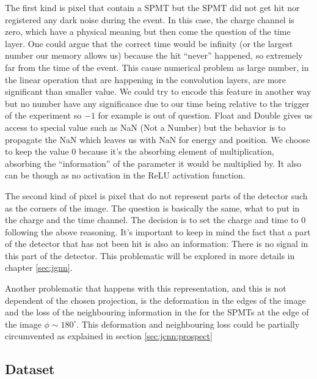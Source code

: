 \documentclass[../main.tex]{subfiles}
\begin{document}
The first kind is pixel that contain a SPMT but the SPMT did not get hit nor registered any dark noise during the event. In this case, the charge channel is zero, which have a physical meaning but then come the question of the time layer. One could argue that the correct time would be infinity (or the largest number our memory allows us) because the hit ``never'' happened, so extremely far from the time of the event. This cause numerical problem as large number, in the linear operation that are happening in the convolution layers, are more significant than smaller value. We could try to encode this feature in another way but no number have any significance due to our time being relative to the trigger of the experiment so $-1$ for example is out of question. Float and Double gives us access to special value such as NaN (Not a Number) \cite{noauthor_ieee_2019} but the behavior is to propagate the NaN which leaves us with NaN for energy and position. We choose to keep the value 0 because it's the absorbing element of multiplication, absorbing the ``information'' of the parameter it would be multiplied by. It also can be though as no activation in the ReLU activation function.

The second kind of pixel is pixel that do not represent parts of the detector such as the corners of the image. The question is basically the same, what to put in the charge and the time channel. The decision is to set the charge and time to 0 following the above reasoning. It's important to keep in mind the fact that a part of the detector that has not been hit is also an information: There is no signal in this part of the detector. This problematic will be explored in more details in chapter \ref{sec:jgnn}.

Another problematic that happens with this representation, and this is not dependent of the chosen projection, is the deformation in the edges of the image and the loss of the neighbouring information in the for the SPMTs at the edge of the image $\phi \sim 180^\circ$. This deformation and neighbouring loss could be partially circumvented as explained in section \ref{sec:jcnn:prospect}

\subsection{Dataset}
\end{document}
